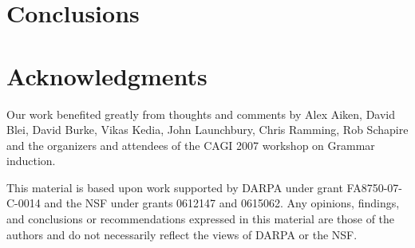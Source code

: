 \documentclass[nocopyrightspace]{sigplanconf}
\begin{document}
\section{Conclusions}
\label{sec:conclusion}


\section*{Acknowledgments}

Our work benefited greatly from thoughts and comments by
Alex Aiken, David Blei, David Burke, Vikas Kedia, John Launchbury, Chris Ramming, 
Rob Schapire
and the organizers and attendees of the CAGI 2007 workshop on Grammar
induction.

This material is based upon work 
supported by DARPA under grant FA8750-07-C-0014
and the NSF
   under grants 0612147 and 0615062.
Any opinions, findings, and conclusions or recommendations
   expressed in this material are those of the authors and do not
   necessarily reflect the views of DARPA or the NSF.




%
\end{document}
